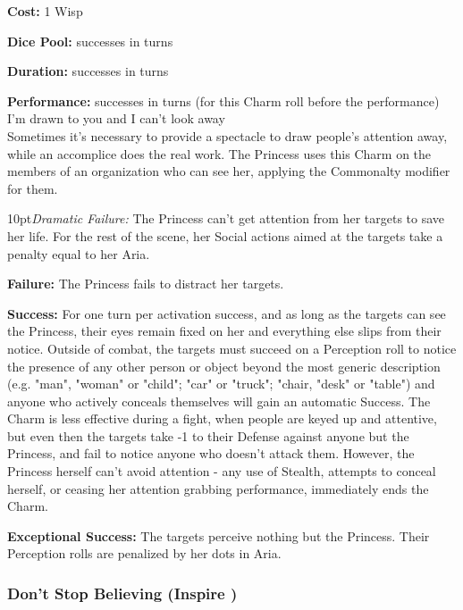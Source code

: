 \noindent \textbf{Cost:} 1 Wisp

\noindent \textbf{Dice Pool:} successes in turns

\noindent \textbf{Duration:} successes in turns

\noindent \textbf{Performance:} successes in turns (for this Charm roll before the performance) \\

\noindent I'm drawn to you and I can't look away \\

\noindent Sometimes it's necessary to provide a spectacle to draw people's attention away, while an accomplice does the real work. The Princess uses this Charm on the members of an organization who can see her, applying the Commonalty modifier for them.

\begin{myindentpar}{10pt}\emph{Dramatic Failure:} The Princess can't get attention from her targets to save her life. For the rest of the scene, her Social actions aimed at the targets take a penalty equal to her Aria.

\textbf{Failure:} The Princess fails to distract her targets.

\textbf{Success:} For one turn per activation success, and as long as the targets can see the Princess, their eyes remain fixed on her and everything else slips from their notice. Outside of combat, the targets must succeed on a Perception roll to notice the presence of any other person or object beyond the most generic description (e.g. "man", "woman" or "child"; "car" or "truck"; "chair, "desk" or "table") and anyone who actively conceals themselves will gain an automatic Success. The Charm is less effective during a fight, when people are keyed up and attentive, but even then the targets take -1 to their Defense against anyone but the Princess, and fail to notice anyone who doesn't attack them. However, the Princess herself can't avoid attention - any use of Stealth, attempts to conceal herself, or ceasing her attention grabbing performance, immediately ends the Charm.

\textbf{Exceptional Success:} The targets perceive nothing but the Princess. Their Perception rolls are penalized by her dots in Aria.\end{myindentpar}


\subsubsection*{Don't Stop Believing (Inspire \textbullet\textbullet\textbullet\textbullet)}

